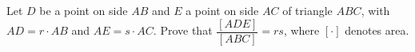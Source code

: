 Let $D$ be a point on side $AB$ and $E$ a point on side $AC$ of triangle $ABC$, with $AD=r\cdot AB$ and $AE=s\cdot AC$. Prove that $\dfrac{[ADE]}{[ABC]}=rs$, where $[\cdot]$ denotes area.
